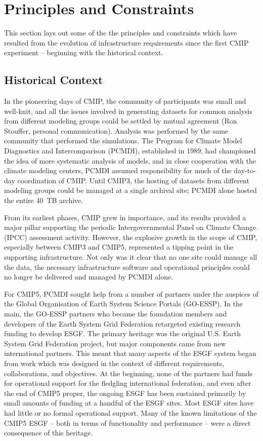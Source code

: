\documentclass[gmd,manuscript]{copernicus}
\begin{document}
\section{Principles and Constraints}
\label{sec:principles}

This section lays out some of the the principles and constraints which
have resulted from the evolution of infrastructure requirements since
the first CMIP experiment -- beginning with the historical context.

\subsection{Historical Context}
\label{sec:history}

In the pioneering days of CMIP, the community of participants was
small and well-knit, and all the issues involved in generating
datasets for common analysis from different modeling groups could be
settled by mutual agreement (Ron Stouffer, personal communication).
Analysis was performed by the same community that performed the
simulations. The Program for Climate Model Diagnostics and
Intercomparison (PCMDI), established in 1989, had championed the idea
of more systematic analysis of models, and in close cooperation with
the climate modeling centers, PCMDI assumed responsibility for much of
the day-to-day coordination of CMIP. Until CMIP3, the hosting of
datasets from different modeling groups could be managed at a single
archival site; PCMDI alone hosted the entire 40~TB archive.

From its earliest phases, CMIP grew in importance, and its results
provided a major pillar supporting the periodic Intergovernmental
Panel on Climate Change (IPCC) assessment activity. However, the
explosive growth in the scope of CMIP, especially between CMIP3 and
CMIP5, represented a tipping point in the supporting infrastructure.
Not only was it clear that no one site could manage all the data, the
necessary infrastructure software and operational principles could no
longer be delivered and managed by PCMDI alone.

For CMIP5, PCMDI sought help from a number of partners under the
auspices of the Global Organisation of Earth System Science Portals
(GO-ESSP). In the main, the GO-ESSP partners who became the foundation
members and developers of the Earth System Grid Federation retargeted
existing research funding to develop ESGF. The primary heritage was
the original U.S. Earth System Grid Federation project, but major
components came from new international partners. This meant that many
aspects of the ESGF system began from work which was designed in the
context of different requirements, collaborations, and objectives. At
the beginning, none of the partners had funds for operational support
for the fledgling international federation, and even after the end of
CMIP5 proper, the ongoing ESGF has been sustained primarily by small
amounts of funding at a handful of the ESGF sites. Most ESGF sites
have had little or no formal operational support. Many of the known
limitations of the CMIP5 ESGF -- both in terms of functionality and
performance -- were a direct consequence of this heritage.
\end{document}
